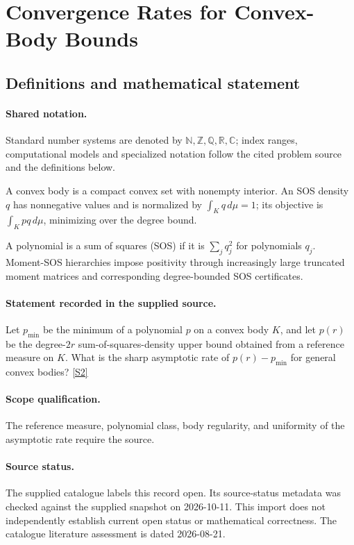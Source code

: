 \documentclass[11pt]{article}
\newcommand{\sref}[2]{\hyperlink{source:#1:#2}{[S#2]}}
\begin{document}
\section{Convergence Rates for Convex-Body Bounds}\label{statement}

\subsection{Definitions and mathematical statement}

\paragraph{Shared notation.}Standard number systems are denoted by $\mathbb N,\mathbb Z,\mathbb Q,\mathbb R,\mathbb C$; index ranges, computational models and specialized notation follow the cited problem source and the definitions below.


A convex body is a compact convex set with nonempty interior. An SOS density $q$ has nonnegative values and is normalized by $\int_Kq\,d\mu=1$; its objective is $\int_Kp q\,d\mu$, minimizing over the degree bound.

A polynomial is a sum of squares (SOS) if it is $\sum_j q_j^2$ for polynomials $q_j$. Moment-SOS hierarchies impose positivity through increasingly large truncated moment matrices and corresponding degree-bounded SOS certificates.
\paragraph{Statement recorded in the supplied source.}
Let $p_{\min}$ be the minimum of a polynomial $p$ on a convex body $K$, and let $p(r)$ be the degree-$2r$ sum-of-squares-density upper bound obtained from a reference measure on $K$. What is the sharp asymptotic rate of $p(r)-p_{\min}$ for general convex bodies? \sref{statement}{2}
\paragraph{Scope qualification.}
The reference measure, polynomial class, body regularity, and uniformity of the asymptotic rate require the source.
\paragraph{Source status.}
The supplied catalogue labels this record open. Its source-status metadata was checked against the supplied snapshot on 2026-10-11. This import does not independently establish current open status or mathematical correctness. The catalogue literature assessment is dated 2026-08-21.
\end{document}

